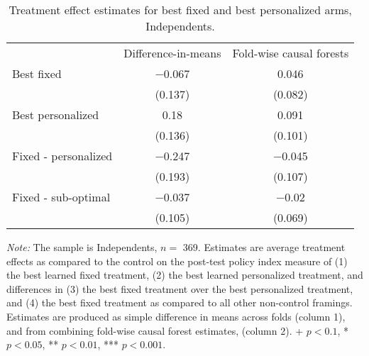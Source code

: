 \begin{table*}

\caption{Treatment effect estimates for best fixed and best personalized arms, Independents. \label{tab:best_framing_independents}}
\centering
\begin{threeparttable}
\begin{tabular}[t]{lcc}
\toprule
 & Difference-in-means & Fold-wise causal forests\\
\cmidrule(lr){2-2} \cmidrule(lr){3-3}
Best fixed & \num{-0.067} & \num{0.046}\\
 & (\num{0.137}) & (\num{0.082})\\
\addlinespace
Best personalized & \num{0.18} & \num{0.091}\\
 & (\num{0.136}) & (\num{0.101})\\
\cmidrule(lr){2-2} \cmidrule(lr){3-3}
\addlinespace
Fixed - personalized & \num{-0.247} & \num{-0.045}\\
 & (\num{0.193}) & (\num{0.107})\\
\addlinespace
Fixed - sub-optimal & \num{-0.037} & \num{-0.02}\\
 & (\num{0.105}) & (\num{0.069})\\
\bottomrule
\end{tabular}
\begin{tablenotes}
\item \footnotesize \textit{Note:} The sample is Independents, $n = $ \num{369}. Estimates are average treatment effects as compared to the control on the post-test policy index measure of (1) the best learned fixed treatment, (2) the best learned personalized treatment, and differences in (3) the best fixed treatment over the best personalized treatment, and (4) the best fixed treatment as compared to all other non-control framings. Estimates are produced as simple difference in means across folds (column 1), and from combining fold-wise causal forest estimates, (column 2). + $p < 0.1$, * $p < 0.05$, ** $p < 0.01$, *** $p < 0.001$.
\end{tablenotes}
\end{threeparttable}
\end{table*}
